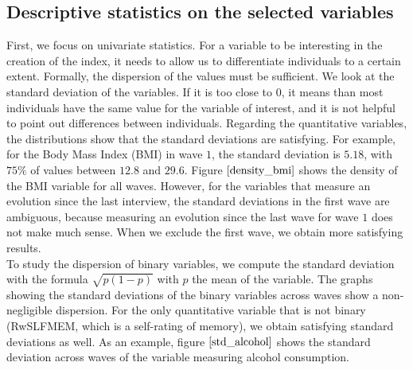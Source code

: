 \documentclass[]{article}
\begin{document}
\subsection{Descriptive statistics on the selected variables}
First, we focus on univariate statistics. For a variable to be interesting in the creation of the index, it needs to allow us to differentiate individuals to a certain extent. Formally, the dispersion of the values must be sufficient. We look at the standard deviation of the variables. If it is too close to $0$, it means than most individuals have the same value for the variable of interest, and it is not helpful to point out differences between individuals. Regarding the quantitative variables, the distributions show that the standard deviations are satisfying. For example, for the Body Mass Index (BMI) in wave $1$, the standard deviation is $5.18$, with $75\%$ of values between $12.8$ and $29.6$. Figure $\ref{density_bmi}$ shows the density of the BMI variable for all waves. However, for the variables that measure an evolution since the last interview, the standard deviations in the first wave are ambiguous, because measuring an evolution since the last wave for wave $1$ does not make much sense. When we exclude the first wave, we obtain more satisfying results.\\

\noindent
To study the dispersion of binary variables, we compute the standard deviation with the formula $\sqrt{p(1-p)}$ with $p$ the mean of the variable. The graphs showing the standard deviations of the binary variables across waves show a non-negligible dispersion. For the only quantitative variable that is not binary (RwSLFMEM, which is a self-rating of memory), we obtain satisfying standard deviations as well. As an example, figure $\ref{std_alcohol}$ shows the standard deviation across waves of the variable measuring alcohol consumption.\\
\end{document}
